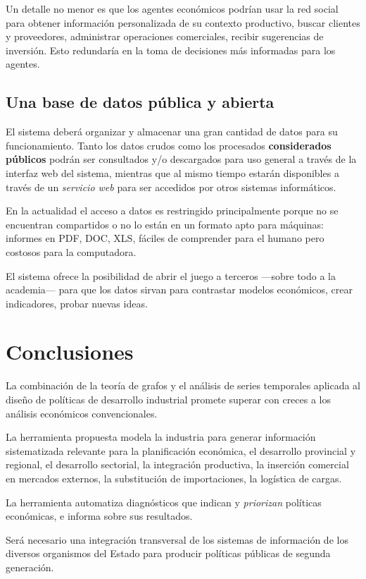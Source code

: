\documentclass[a4paper]{report}
\begin{document}
Un detalle no menor es que los agentes económicos podrían usar la red social para obtener información personalizada de su contexto productivo, buscar clientes y proveedores, administrar operaciones comerciales, recibir sugerencias de inversión. Esto redundaría en la toma de decisiones más informadas para los agentes.

\subsection*{Una base de datos pública y abierta}

El sistema deberá organizar y almacenar una gran cantidad de datos para su funcionamiento. Tanto los datos crudos como los procesados \textbf{considerados públicos} podrán ser consultados y/o descargados para uso general a través de la interfaz web del sistema, mientras que al mismo tiempo estarán disponibles a través de un \textit{servicio web} para ser accedidos por otros sistemas informáticos.

En la actualidad el acceso a datos es restringido principalmente porque no se encuentran compartidos o no lo están en un formato apto para máquinas: informes en PDF, DOC, XLS, fáciles de comprender para el humano pero costosos para la computadora.

El sistema ofrece la posibilidad de abrir el juego a terceros —sobre todo a la academia— para que los datos sirvan para contrastar modelos económicos, crear indicadores, probar nuevas ideas.

\section*{Conclusiones}


La combinación de la teoría de grafos y el análisis de series temporales aplicada al diseño de políticas de desarrollo industrial promete superar con creces a los análisis económicos convencionales.

La herramienta propuesta modela la industria para generar información sistematizada relevante para la planificación económica, el desarrollo provincial y regional, el desarrollo sectorial, la integración productiva, la inserción comercial en mercados externos, la substitución de importaciones, la logística de cargas.

La herramienta automatiza diagnósticos que indican y \textit{priorizan} políticas económicas, e informa sobre sus resultados.

Será necesario una integración transversal de los sistemas de información de los diversos organismos del Estado para producir políticas públicas de segunda generación.
\end{document}
